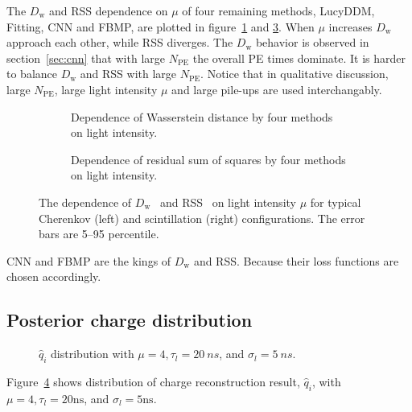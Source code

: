 
The $D_\mathrm{w}$ and RSS dependence on $\mu$ of four remaining methods, LucyDDM, Fitting, CNN and FBMP, are plotted in figure~\ref{fig:wdistsummary} and \ref{fig:rsssummary}.  When $\mu$ increases $D_\mathrm{w}$ approach each other, while RSS diverges.  The $D_\mathrm{w}$ behavior is observed in section~\ref{sec:cnn} that with large $N_\mathrm{PE}$ the overall PE times dominate.  It is harder to balance $D_\mathrm{w}$ and RSS with large $N_\mathrm{PE}$.  Notice that in qualitative discussion, large $N_\mathrm{PE}$, large light intensity $\mu$ and large pile-ups are used interchangably.
\begin{figure}[H]
  \begin{subfigure}[b]{\textwidth}
    \resizebox{\textwidth}{!}{}
    \caption{\label{fig:wdistsummary}Dependence of Wasserstein distance by four methods on light intensity.}
  \end{subfigure}

  \vspace{0.5em}
  \begin{subfigure}[b]{\textwidth}
    \resizebox{\textwidth}{!}{}
    \caption{\label{fig:rsssummary}Dependence of residual sum of squares by four methods on light intensity.}
  \end{subfigure}
  \caption{The dependence of $D_\mathrm{w}$~ and RSS~ on light intensity $\mu$ for typical Cherenkov (left) and scintillation (right) configurations.  The error bars are 5--95 percentile.}
\end{figure}
CNN and FBMP are the kings of $D_\mathrm{w}$ and RSS.  Because their loss functions are chosen accordingly.

\subsection{Posterior charge distribution}

\begin{figure}[H]
    \centering
    \resizebox{0.6\textwidth}{!}{}
    \caption{\label{fig:recchargehist} $\hat{q}_i$ distribution with $\mu=4, \tau_l=\SI{20}{ns}$, and $\sigma_l=\SI{5}{ns}$.}
\end{figure}

Figure~\ref{fig:recchargehist} shows distribution of charge reconstruction result, $\hat{q}_i$, with $\mu=4, \tau_l=20\mathrm{ns}$, and $\sigma_l=5\mathrm{ns}$. 

